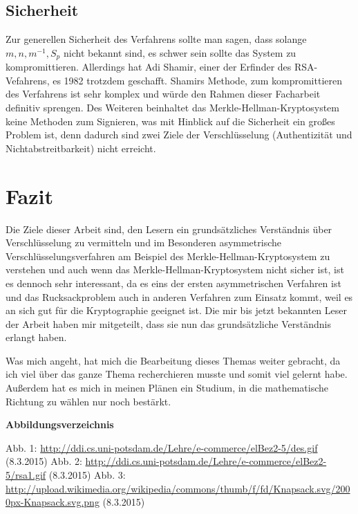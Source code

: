 \documentclass[a4paper,12pt,titlepage]{article}
\begin{document}
\subsection{Sicherheit}
Zur generellen Sicherheit des Verfahrens sollte man sagen, dass solange $m, n, m^{-1}, S_p$ nicht bekannt sind, es schwer sein sollte das System zu kompromittieren. Allerdings hat Adi Shamir, einer der Erfinder des RSA-Vefahrens, es 1982 trotzdem geschafft. Shamirs Methode, zum kompromittieren des Verfahrens ist sehr komplex und würde den Rahmen dieser Facharbeit definitiv sprengen. Des Weiteren beinhaltet das Merkle-Hellman-Kryptosystem keine Methoden zum Signieren, was mit Hinblick auf die Sicherheit ein großes Problem ist, denn dadurch sind zwei Ziele der Verschlüsselung (Authentizität und Nichtabstreitbarkeit) nicht erreicht. %

\newpage
\section{Fazit} 
Die Ziele dieser Arbeit sind, den Lesern ein grundsätzliches Verständnis über Verschlüsselung zu vermitteln und im Besonderen asymmetrische Verschlüsselungsverfahren am Beispiel des Merkle-Hellman-Kryptosystem zu verstehen und 
auch wenn das Merkle-Hellman-Kryptosystem nicht sicher ist, ist es dennoch sehr interessant, da es eins der ersten asymmetrischen Verfahren ist und das Rucksackproblem auch in anderen Verfahren zum Einsatz kommt, weil es an sich gut für die Kryptographie geeignet ist. Die mir bis jetzt bekannten Leser der Arbeit haben mir mitgeteilt, dass sie nun das grundsätzliche Verständnis erlangt haben.

Was mich angeht, hat mich die Bearbeitung dieses Themas weiter gebracht, da ich viel über das ganze Thema recherchieren musste und somit viel gelernt habe. Außerdem hat es mich in meinen Plänen ein Studium, in die mathematische Richtung zu wählen nur noch bestärkt. 
\newpage

\begin{flushleft}

\end{flushleft}
\large 
\textbf{Abbildungsverzeichnis} \newline
\normalsize
\begin{flushleft}
Abb. 1: \url{http://ddi.cs.uni-potsdam.de/Lehre/e-commerce/elBez2-5/des.gif} (8.3.2015) \newline
Abb. 2: \url{http://ddi.cs.uni-potsdam.de/Lehre/e-commerce/elBez2-5/rsa1.gif} (8.3.2015) \newline
Abb. 3: \url{http://upload.wikimedia.org/wikipedia/commons/thumb/f/fd/Knapsack.svg/2000px-Knapsack.svg.png} (8.3.2015)
\end{flushleft}
\newpage
\end{document}
